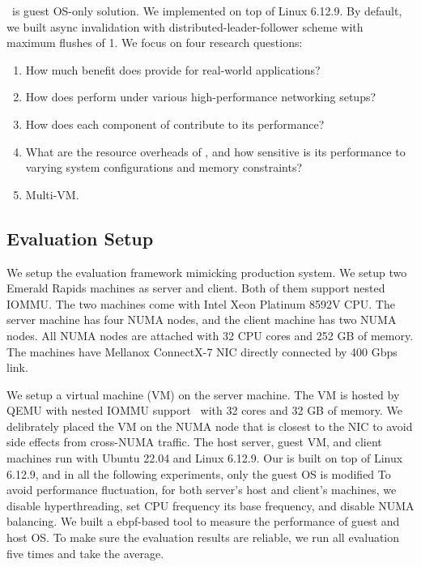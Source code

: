 \name\ is guest OS-only solution. We implemented on top of Linux 6.12.9.
By default, we built async invalidation with distributed-leader-follower scheme with maximum flushes of 1.
We focus on four research questions:

\begin{enumerate}
    \item How much benefit does \brand provide for real-world applications?
    \item How does \brand perform under various high-performance networking setups?
    \item How does each component of \brand contribute to its performance?
    \item What are the resource overheads of \brand, and how sensitive is its performance to varying system configurations and memory constraints?
    \item Multi-VM. 
\end{enumerate}



\subsection{Evaluation Setup}

We setup the evaluation framework mimicking production system.
We setup two Emerald Rapids machines as server and client. Both of them support nested IOMMU.
The two machines come with Intel Xeon Platinum 8592V CPU.
The server machine has four NUMA nodes, and the client machine has two NUMA nodes.
All NUMA nodes are attached with 32 CPU cores and 252 GB of memory.
The machines have Mellanox ConnectX-7 NIC directly connected by 400 Gbps link.

We setup a virtual machine (VM) on the server machine. 
The VM is hosted by QEMU with nested IOMMU support~\cite{yiliu1765qemu} with 32 cores and 32 GB of memory.
We delibrately placed the VM on the NUMA node that is closest to the NIC to avoid side effects from cross-NUMA traffic.
The host server, guest VM, and client machines run with Ubuntu 22.04 and Linux 6.12.9.
Our \brand is built on top of Linux 6.12.9, and in all the following experiments, only the guest OS is modified
To avoid performance fluctuation, 
for both server's host and client's machines,
we disable hyperthreading, set CPU frequency its base frequency, and disable NUMA balancing.
We built a ebpf-based tool to measure the performance of guest and host OS.
To make sure the evaluation results are reliable, 
we run all evaluation five times and take the average.



